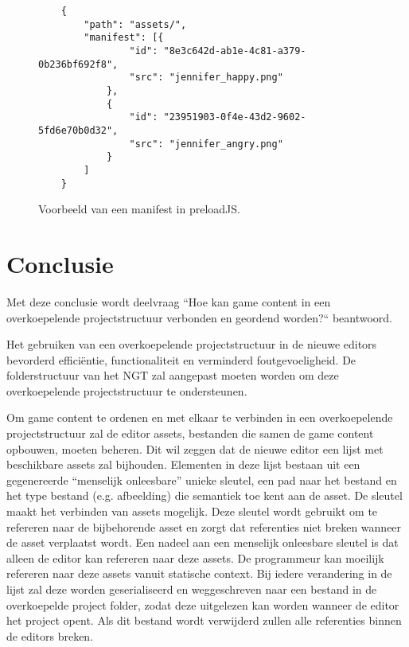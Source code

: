 \begin{figure}[htb]
    \centering
    \lstset{language=JavaScript}
    \begin{lstlisting}
    {
        "path": "assets/",
        "manifest": [{
                "id": "8e3c642d-ab1e-4c81-a379-0b236bf692f8",
                "src": "jennifer_happy.png"
            },
            {
                "id": "23951903-0f4e-43d2-9602-5fd6e70b0d32",
                "src": "jennifer_angry.png"
            }
        ]
    }               
    \end{lstlisting}
    \caption{Voorbeeld van een manifest in preloadJS.}
    \label{lst:manifestexamplepreloadjs}
\end{figure}

\pagebreak
\section{Conclusie}
Met deze conclusie wordt deelvraag “Hoe kan game content in een overkoepelende projectstructuur verbonden en geordend worden?“ beantwoord.

Het gebruiken van een overkoepelende projectstructuur in de nieuwe editors bevorderd efficiëntie, functionaliteit en verminderd foutgevoeligheid. De folderstructuur van het NGT zal aangepast moeten worden om deze overkoepelende projectstructuur te ondersteunen.

Om game content te ordenen en met elkaar te verbinden in een overkoepelende projectstructuur zal de editor assets, bestanden die samen de game content opbouwen, moeten beheren. Dit wil zeggen dat de nieuwe editor een lijst met beschikbare assets zal bijhouden. Elementen in deze lijst bestaan uit een gegenereerde “menselijk onleesbare” unieke sleutel, een pad naar het bestand en het type bestand (e.g. afbeelding) die semantiek toe kent aan de asset. De sleutel maakt het verbinden van assets mogelijk. Deze sleutel wordt gebruikt om te refereren naar de bijbehorende asset en zorgt dat referenties niet breken wanneer de asset verplaatst wordt. Een nadeel aan een menselijk onleesbare sleutel is dat alleen de editor kan refereren naar deze assets. De programmeur kan moeilijk refereren naar deze assets vanuit statische context. Bij iedere verandering in de lijst zal deze worden geserialiseerd en weggeschreven naar een bestand in de overkoepelde project folder, zodat deze uitgelezen kan worden wanneer de editor het project opent. Als dit bestand wordt verwijderd zullen alle referenties binnen de editors breken.

